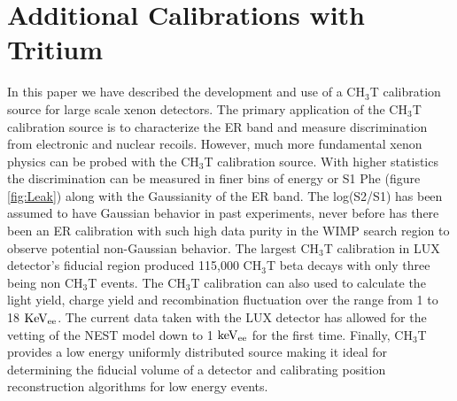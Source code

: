 \section{Additional Calibrations with Tritium}

In this paper we have described the development and use of a CH$_3$T calibration source for large scale xenon detectors. The primary application of the CH$_3$T calibration source is to characterize the ER band and measure discrimination from electronic and nuclear recoils. However, much more fundamental xenon physics can be probed with the CH$_3$T calibration source. With higher statistics the discrimination can be measured in finer bins of energy or S1 Phe (figure \ref{fig:Leak}) along with the Gaussianity of the ER band. The log(S2/S1) has been assumed to have Gaussian behavior in past experiments, never before has there been an ER calibration with such high data purity in the WIMP search region to observe potential non-Gaussian behavior. The largest CH$_3$T calibration in LUX detector's fiducial region produced 115,000 CH$_3$T beta decays with only three being non CH$_3$T events. 
The CH$_3$T calibration can also used to calculate the light yield, charge yield and recombination fluctuation over the range from 1 to 18 $\rm KeV_{ee}$. The current data taken with the LUX detector has allowed for the vetting of the NEST model down to 1 $\rm keV_{ee}$ for the first time. Finally, CH$_3$T provides a low energy uniformly distributed source making it ideal for determining the fiducial volume of a detector and calibrating position reconstruction algorithms for low energy events.


